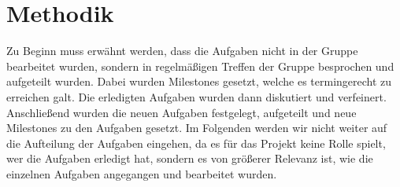 \section{Methodik}
Zu Beginn muss erw\"{a}hnt werden, dass die Aufgaben nicht in der Gruppe bearbeitet wurden, sondern in regelm\"{a}{\ss}igen Treffen der Gruppe besprochen und aufgeteilt wurden. Dabei wurden Milestones gesetzt, welche es termingerecht zu erreichen galt. Die erledigten Aufgaben wurden dann diskutiert und verfeinert. Anschlie{\ss}end wurden die neuen Aufgaben festgelegt, aufgeteilt und neue Milestones zu den Aufgaben gesetzt. Im Folgenden werden wir nicht weiter auf die Aufteilung der Aufgaben eingehen, da es f\"{u}r das Projekt keine Rolle spielt, wer die Aufgaben erledigt hat, sondern es von gr\"{o}{\ss}erer Relevanz ist, wie die einzelnen Aufgaben angegangen und bearbeitet wurden.
